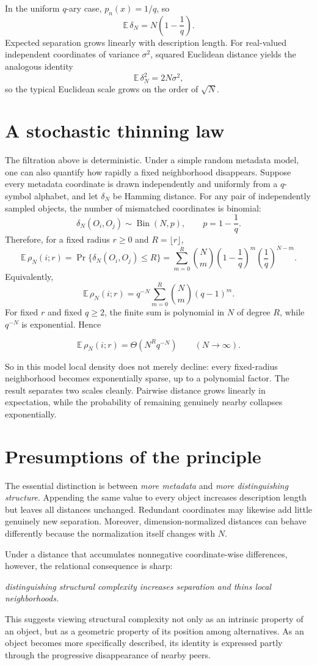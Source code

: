 \documentclass[10pt]{article}
\begin{document}
In the uniform $q$-ary case, $p_n(x)=1/q$, so
\[
\mathbb E\,\delta_N=N\left(1-\frac1q\right).
\]
Expected separation grows linearly with description length. For real-valued independent coordinates of variance $\sigma^2$, squared Euclidean distance yields the analogous identity
\[
\mathbb E\,\delta_N^2=2N\sigma^2,
\]
so the typical Euclidean scale grows on the order of $\sqrt N$.

\section*{A stochastic thinning law}
The filtration above is deterministic. Under a simple random metadata model, one can also quantify how rapidly a fixed neighborhood disappears. Suppose every metadata coordinate is drawn independently and uniformly from a $q$-symbol alphabet, and let $\delta_N$ be Hamming distance. For any pair of independently sampled objects, the number of mismatched coordinates is binomial:
\[
\delta_N(O_i,O_j)\sim\operatorname{Bin}(N,p),
\qquad p=1-\frac1q.
\]
Therefore, for a fixed radius $r\ge 0$ and $R=\lfloor r\rfloor$,
\[
\mathbb E\,\rho_N(i;r)
=\Pr\{\delta_N(O_i,O_j)\le R\}
=\sum_{m=0}^{R}\binom Nm
\left(1-\frac1q\right)^m
\left(\frac1q\right)^{N-m}.
\]
Equivalently,
\[
\mathbb E\,\rho_N(i;r)
=q^{-N}\sum_{m=0}^{R}\binom Nm(q-1)^m.
\]
For fixed $r$ and fixed $q\ge 2$, the finite sum is polynomial in $N$ of degree $R$, while $q^{-N}$ is exponential. Hence
\begin{highlightbox}
\[
\mathbb E\,\rho_N(i;r)=\Theta\!\left(N^R q^{-N}\right)
\qquad(N\to\infty).
\]
\end{highlightbox}
So in this model local density does not merely decline: every fixed-radius neighborhood becomes exponentially sparse, up to a polynomial factor. The result separates two scales cleanly. Pairwise distance grows linearly in expectation, while the probability of remaining genuinely nearby collapses exponentially.

\section*{Presumptions of the principle}
The essential distinction is between \emph{more metadata} and \emph{more distinguishing structure}. Appending the same value to every object increases description length but leaves all distances unchanged. Redundant coordinates may likewise add little genuinely new separation. Moreover, dimension-normalized distances can behave differently because the normalization itself changes with $N$.

Under a distance that accumulates nonnegative coordinate-wise differences, however, the relational consequence is sharp:
\begin{highlightbox}
\centering
\emph{distinguishing structural complexity increases separation and thins local neighborhoods.}
\end{highlightbox}
This suggests viewing structural complexity not only as an intrinsic property of an object, but as a geometric property of its position among alternatives. As an object becomes more specifically described, its identity is expressed partly through the progressive disappearance of nearby peers.
\end{document}
